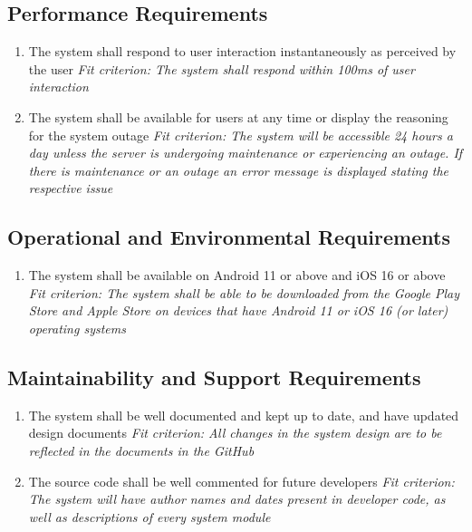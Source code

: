 \documentclass[12pt]{article}
\begin{document}
\subsection{Performance Requirements}
\begin{enumerate}[PR\arabic*.]
	\item The system shall respond to user interaction instantaneously as perceived by the user\newline
    \textit{Fit criterion: The system shall respond within 100ms of user interaction}
    \item The system shall be available for users at any time or display the reasoning for the system outage\newline
    \textit{Fit criterion: The system will be accessible 24 hours a day unless the server is undergoing maintenance or experiencing an outage. If there is maintenance or an outage an error message is displayed stating the respective issue }
\end{enumerate}
\subsection{Operational and Environmental Requirements}
\begin{enumerate}[OE\arabic*.]
    \item The system shall be available on Android 11 or above and iOS 16 or above\newline
    \textit{Fit criterion: The system shall be able to be downloaded from the Google Play Store and Apple Store on devices that have Android 11 or iOS 16 (or later) operating systems}
\end{enumerate}
\subsection{Maintainability and Support Requirements}
\begin{enumerate}[MS\arabic*.]
    \item The system shall be well documented and kept up to date, and have updated design documents\newline
    \textit{Fit criterion: All changes in the system design are to be reflected in the documents in the GitHub}
    \item The source code shall be well commented for future developers\newline
    \textit{Fit criterion: The system will have author names and dates present in developer code, as well as descriptions of every system module}
\end{enumerate}
\end{document}
